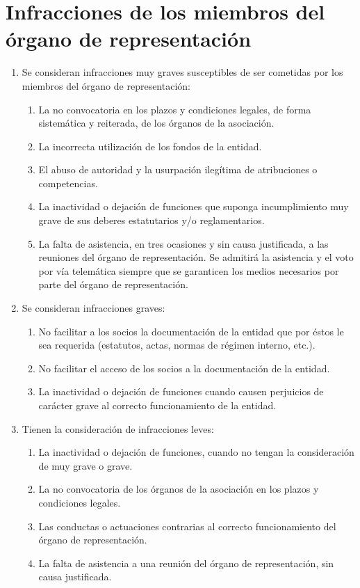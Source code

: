 \documentclass[a4paper, 12pt, oneside]{book}
\begin{document}
\section{Infracciones de los miembros del órgano de representación}

\begin{enumerate}
    \item Se consideran infracciones muy graves susceptibles de ser cometidas por los miembros del órgano de representación:
    \begin{enumerate}
        \item La no convocatoria en los plazos y condiciones legales, de forma sistemática y reiterada, de los órganos de la asociación.  
        \item La incorrecta utilización de los fondos de la entidad.  
        \item El abuso de autoridad y la usurpación ilegítima de atribuciones o competencias.  
        \item La inactividad o dejación de funciones que suponga incumplimiento muy grave de sus deberes estatutarios y/o reglamentarios.  
        \item La falta de asistencia, en tres ocasiones y sin causa justificada, a las reuniones del órgano de representación. Se admitirá la asistencia y el voto por vía telemática siempre que se garanticen los medios necesarios por parte del órgano de representación.
    \end{enumerate}
    \item Se consideran infracciones graves:
    \begin{enumerate}
        \item No facilitar a los socios la documentación de la entidad que por éstos le sea requerida (estatutos, actas, normas de régimen interno, etc.).  
        \item No facilitar el acceso de los socios a la documentación de la entidad.  
        \item La inactividad o dejación de funciones cuando causen perjuicios de carácter grave al correcto funcionamiento de la entidad.
    \end{enumerate}
    \item Tienen la consideración de infracciones leves:
    \begin{enumerate}
        \item La inactividad o dejación de funciones, cuando no tengan la consideración de muy grave o grave.  
        \item La no convocatoria de los órganos de la asociación en los plazos y condiciones legales. 
        \item Las conductas o actuaciones contrarias al correcto funcionamiento del órgano de representación.  
        \item La falta de asistencia a una reunión del órgano de representación, sin causa justificada.
    \end{enumerate}
\end{enumerate}
\end{document}

